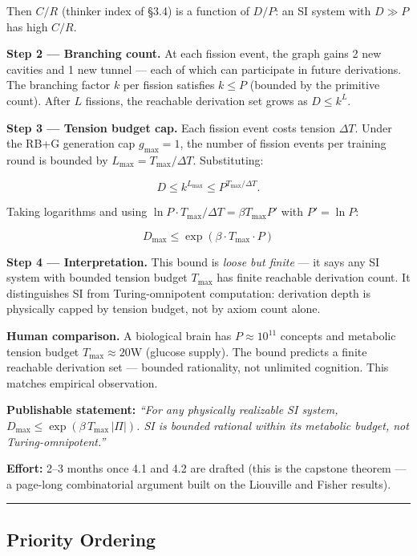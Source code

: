 \documentclass[
  11pt,
  a4paper,
]{article}
\begin{document}
Then \(C/R\) (thinker index of §3.4) is a function of \(D/P\): an SI
system with \(D \gg P\) has high \(C/R\).

\textbf{Step 2 --- Branching count.} At each fission event, the graph
gains 2 new cavities and 1 new tunnel --- each of which can participate
in future derivations. The branching factor \(k\) per fission satisfies
\(k \leq P\) (bounded by the primitive count). After \(L\) fissions, the
reachable derivation set grows as \(D \leq k^L\).

\textbf{Step 3 --- Tension budget cap.} Each fission event costs tension
\(\Delta T\). Under the RB+G generation cap \(g_\text{max} = 1\), the
number of fission events per training round is bounded by
\(L_\text{max} = T_\text{max} / \Delta T\). Substituting:

\[
D \leq k^{L_\text{max}} \leq P^{T_\text{max} / \Delta T}.
\]

Taking logarithms and using
\(\ln P \cdot T_\text{max} / \Delta T = \beta T_\text{max} P'\) with
\(P' = \ln P\):

\[
\boxed{D_\text{max} \leq \exp\!\left(\beta \cdot T_\text{max} \cdot P\right)}
\]

\textbf{Step 4 --- Interpretation.} This bound is \emph{loose but
finite} --- it says any SI system with bounded tension budget
\(T_\text{max}\) has finite reachable derivation count. It distinguishes
SI from Turing-omnipotent computation: derivation depth is physically
capped by tension budget, not by axiom count alone.

\textbf{Human comparison.} A biological brain has \(P \approx 10^{11}\)
concepts and metabolic tension budget \(T_\text{max} \approx 20\)W
(glucose supply). The bound predicts a finite reachable derivation set
--- bounded rationality, not unlimited cognition. This matches empirical
observation.

\textbf{Publishable statement:} \emph{``For any physically realizable SI
system, \(D_\text{max} \leq \exp(\beta \, T_\text{max} \, |\Pi|)\). SI
is bounded rational within its metabolic budget, not
Turing-omnipotent.''}

\textbf{Effort:} 2--3 months once 4.1 and 4.2 are drafted (this is the
capstone theorem --- a page-long combinatorial argument built on the
Liouville and Fisher results).

\begin{center}\rule{0.5\linewidth}{0.5pt}\end{center}

\subsection{Priority Ordering}\label{priority-ordering}
\end{document}
